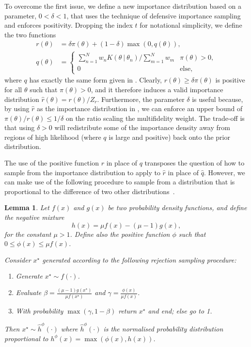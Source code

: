 \documentclass[12pt, onecolumn]{article}
\newtheorem{lemma}[theorem]{Lemma}
\begin{document}
To overcome the first issue, we define a new importance distribution based on a parameter, $0<\delta<1$, that uses the technique of defensive importance sampling~\cite{Owen2013} and enforces positivity.
Dropping the index $t$ for notational simplicity, we define the two functions
\begin{subequations}
\label{eq:DefensiveImportance}
\begin{align}
 r(\theta) &= \delta \pi(\theta) + (1-\delta) \max\left( 0, q(\theta) \right),
 \\
 q(\theta) &= \begin{cases}
                      \sum_{n=1}^{N} w_n K(\theta ~|~ \theta_n) \big/ \sum_{m=1}^{N} w_m & \pi(\theta)>0, 
                      \\
                      0 & \text{else,}
                    \end{cases}
\end{align}
\end{subequations}
where $q$ has exactly the same form given in .
Clearly, $r(\theta) \geq \delta \pi(\theta)$ is positive for all $\theta$ such that $\pi(\theta)>0$, and it therefore induces a valid importance distribution $\hat r(\theta) = r(\theta)/Z_r$.
Furthermore, the parameter $\delta$ is useful because, by using $\hat r$ as the importance distribution in , we can enforce an upper bound of $\pi(\theta)/r(\theta) \leq 1/\delta$ on the ratio scaling the multifidelity weight.
The trade-off is that using $\delta>0$ will redistribute some of the importance density away from regions of high likelihood (where $q$ is large and positive) back onto the prior distribution.

The use of the positive function $r$ in place of $q$ transposes the question of how to sample from the importance distribution to apply to $\hat r$ in place of $\hat q$.
However, we can make use of the following procedure to sample from a distribution that is proportional to the difference of two other distributions~\cite{Rabusseau2014}.

\begin{lemma}
\label{negmix}
Let $f(x)$ and $g(x)$ be two probability density functions, and define the negative mixture
\[
 h(x) = \mu f(x) - (\mu - 1) g(x),
\]
for the constant $\mu > 1$. 
Define also the positive function $\phi$ such that $0 \leq \phi(x) \leq \mu f(x)$. 

Consider $x^\star$ generated according to the following rejection sampling procedure:
\begin{enumerate}
 \item Generate $x^\star \sim f(\cdot)$.
 \item Evaluate $\beta = \frac{(\mu-1)g(x^\star)}{\mu f(x^\star)}$ and $\gamma = \frac{\phi(x)}{\mu f(x)}$.
 \item With probability $\max(\gamma, 1-\beta)$ return $x^\star$ and end; else go to 1.
\end{enumerate}
Then $x^\star \sim \hat h^\phi(\cdot)$ where $\hat h^\phi(\cdot)$ is the normalised probability distribution proportional to $h^\phi(x) = \max(\phi(x), h(x))$.
\end{lemma}
\end{document}
